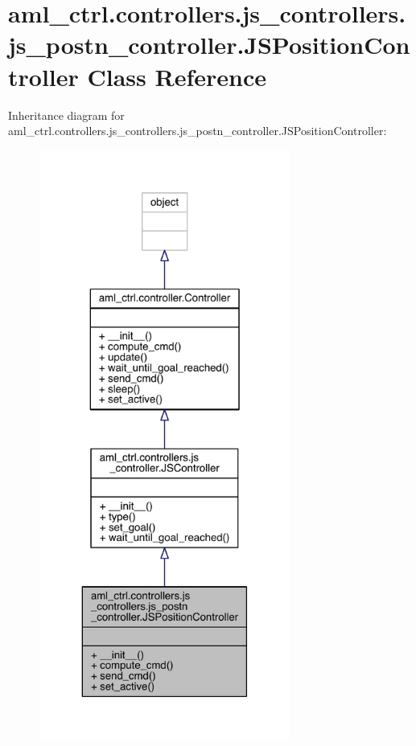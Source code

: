 \hypertarget{classaml__ctrl_1_1controllers_1_1js__controllers_1_1js__postn__controller_1_1_j_s_position_controller}{}\section{aml\+\_\+ctrl.\+controllers.\+js\+\_\+controllers.\+js\+\_\+postn\+\_\+controller.\+J\+S\+Position\+Controller Class Reference}
\label{classaml__ctrl_1_1controllers_1_1js__controllers_1_1js__postn__controller_1_1_j_s_position_controller}


Inheritance diagram for aml\+\_\+ctrl.\+controllers.\+js\+\_\+controllers.\+js\+\_\+postn\+\_\+controller.\+J\+S\+Position\+Controller\+:\nopagebreak
\begin{figure}[H]
\begin{center}
\leavevmode
\includegraphics[height=550pt]{classaml__ctrl_1_1controllers_1_1js__controllers_1_1js__postn__controller_1_1_j_s_position_controller__inherit__graph}
\end{center}
\end{figure}


